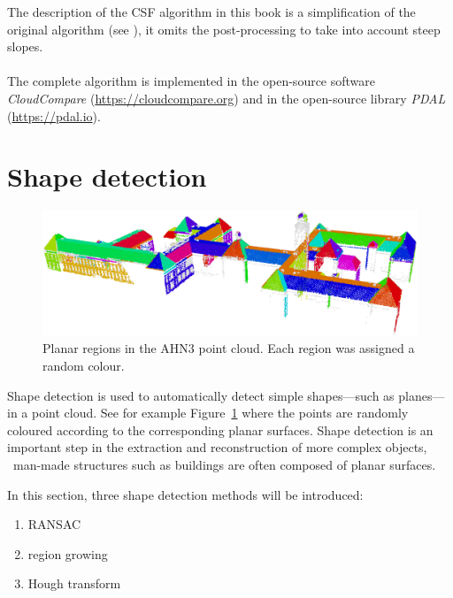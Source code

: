 \begin{floatbox}
  \begin{kaobox-practice}[frametitle=\faCog\ CSF is implemented in several open-source libraries]
  The description of the CSF algorithm in this book is a simplification of the original algorithm (see \citet{Zhang16}), it omits the post-processing to take into account steep slopes.
  \\ \\
  The complete algorithm is implemented in the open-source software \emph{CloudCompare} (\url{https://cloudcompare.org}) and in the open-source library \emph{PDAL} (\url{https://pdal.io}).
  \end{kaobox-practice}
\end{floatbox}


%
\section{Shape detection}%
\label{sec:shape-detection}%

\begin{figure}
	\centering
	\includegraphics[width=\linewidth]{bk-planes.png}
	\caption{Planar regions in the AHN3 point cloud. Each region was assigned a random colour.}%
\label{fig:bk-planes}
\end{figure}

Shape detection is used to automatically detect simple shapes---such as planes---in a point cloud.
See for example Figure~\ref{fig:bk-planes} where the points are randomly coloured according to the corresponding planar surfaces.
Shape detection is an important step in the extraction and reconstruction of more complex objects, \eg\ man-made structures such as buildings are often composed of planar surfaces.

In this section, three shape detection methods will be introduced: 
\begin{enumerate}
  \item RANSAC 
  \item region growing 
  \item Hough transform
\end{enumerate}


